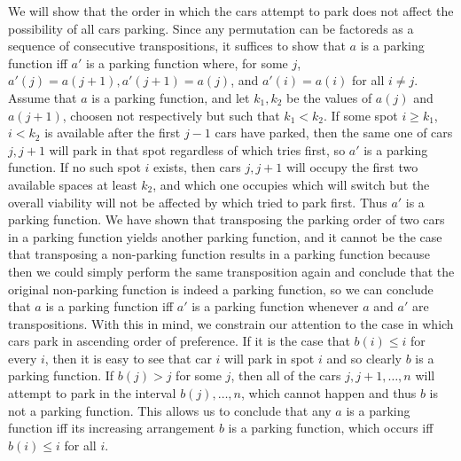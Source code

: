\documentclass{article}
\begin{document}
\begin{alphalist}
\item We will show that the order in which the cars attempt to park does not affect the possibility of all cars parking. Since any permutation can be factoreds as a sequence of consecutive transpositions, it suffices to show that $a$ is a parking function iff $a'$ is a parking function where, for some $j$, $a'(j) = a(j+1), a'(j+1) = a(j)$, and $a'(i) = a(i)$ for all $i \ne j$. Assume that $a$ is a parking function, and let $k_1, k_2$ be the values of $a(j)$ and $a(j+1)$, choosen not respectively but such that $k_1 < k_2$. If some spot $i \ge k_1$, $i < k_2$ is available after the first $j-1$ cars have parked, then the same one of cars $j, j+1$ will park in that spot regardless of which tries first, so $a'$ is a parking function. If no such spot $i$ exists, then cars $j, j+1$ will occupy the first two available spaces at least $k_2$, and which one occupies which will switch but the overall viability will not be affected by which tried to park first. Thus $a'$ is a parking function. We have shown that transposing the parking order of two cars in a parking function yields another parking function, and it cannot be the case that transposing a non-parking function results in a parking function because then we could simply perform the same transposition again and conclude that the original non-parking function is indeed a parking function, so we can conclude that $a$ is a parking function iff $a'$ is a parking function whenever $a$ and $a'$ are transpositions. With this in mind, we constrain our attention to the case in which cars park in ascending order of preference. If it is the case that $b(i) \le i$ for every $i$, then it is easy to see that car $i$ will park in spot $i$ and so clearly $b$ is a parking function. If $b(j) > j$ for some $j$, then all of the cars $j, j+1, \ldots, n$ will attempt to park in the interval $b(j), \ldots, n$, which cannot happen and thus $b$ is not a parking function. This allows us to conclude that any $a$ is a parking function iff its increasing arrangement $b$ is a parking function, which occurs iff $b(i) \le i$ for all $i$.

\end{alphalist}
\end{document}
